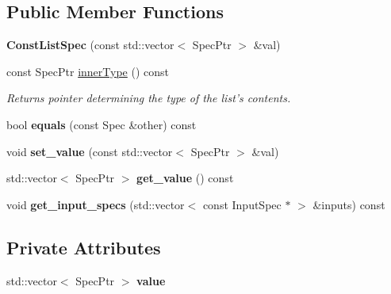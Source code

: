 \subsection*{Public Member Functions}
\begin{DoxyCompactItemize}
\item 
\hypertarget{classgiskard__suturo_1_1ConstListSpec_abb02bc9dc24b253d580deb779896437f}{{\bfseries Const\-List\-Spec} (const std\-::vector$<$ Spec\-Ptr $>$ \&val)}\label{classgiskard__suturo_1_1ConstListSpec_abb02bc9dc24b253d580deb779896437f}

\item 
const Spec\-Ptr \hyperlink{classgiskard__suturo_1_1ConstListSpec_a1373658498d2aa8fe4278daa4950968e}{inner\-Type} () const 
\begin{DoxyCompactList}\small\item\em Returns pointer determining the type of the list's contents. \end{DoxyCompactList}\item 
\hypertarget{classgiskard__suturo_1_1ConstListSpec_aff57dab669937896693aa361ccf8d8d6}{bool {\bfseries equals} (const Spec \&other) const }\label{classgiskard__suturo_1_1ConstListSpec_aff57dab669937896693aa361ccf8d8d6}

\item 
\hypertarget{classgiskard__suturo_1_1ConstListSpec_a30676f4d29567b2aa8109fa10fe80351}{void {\bfseries set\-\_\-value} (const std\-::vector$<$ Spec\-Ptr $>$ \&val)}\label{classgiskard__suturo_1_1ConstListSpec_a30676f4d29567b2aa8109fa10fe80351}

\item 
\hypertarget{classgiskard__suturo_1_1ConstListSpec_ae5530652b0a76365bd7d137f84625434}{std\-::vector$<$ Spec\-Ptr $>$ {\bfseries get\-\_\-value} () const }\label{classgiskard__suturo_1_1ConstListSpec_ae5530652b0a76365bd7d137f84625434}

\item 
\hypertarget{classgiskard__suturo_1_1ConstListSpec_a713a774905b1217fa35d4b9d71152cc0}{void {\bfseries get\-\_\-input\-\_\-specs} (std\-::vector$<$ const Input\-Spec $\ast$ $>$ \&inputs) const }\label{classgiskard__suturo_1_1ConstListSpec_a713a774905b1217fa35d4b9d71152cc0}

\end{DoxyCompactItemize}
\subsection*{Private Attributes}
\begin{DoxyCompactItemize}
\item 
\hypertarget{classgiskard__suturo_1_1ConstListSpec_a137d3d6f4149d636b35dc5727744e04e}{std\-::vector$<$ Spec\-Ptr $>$ {\bfseries value}}\label{classgiskard__suturo_1_1ConstListSpec_a137d3d6f4149d636b35dc5727744e04e}

\end{DoxyCompactItemize}


